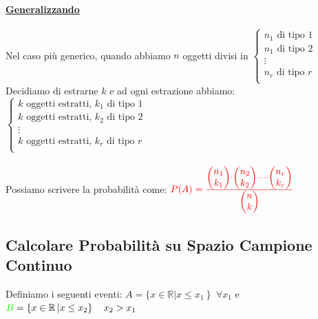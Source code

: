 \documentclass{article}
\begin{document}
\paragraph{\underline{Generalizzando}}
Nel caso più generico, quando abbiamo $n$ oggetti divisi in $\begin{cases}
n_1 \text{ di tipo } 1 \\
n_1 \text{ di tipo } 2 \\
\vdots \\
n_r \text{ di tipo } r \\
\end{cases}$ \\
Decidiamo di estrarne $k$ e ad ogni estrazione abbiamo: $\begin{cases}
k \text{ oggetti estratti, }k_1 \text{ di tipo } 1 \\
k \text{ oggetti estratti, }k_2 \text{ di tipo } 2 \\
\vdots \\
k \text{ oggetti estratti, }k_r \text{ di tipo } r \\
\end{cases}$ \\ \\
Possiamo scrivere la probabilità come: $\color{red} P(A) = \frac{\left(\begin{matrix} n_1 \\ k_1\end{matrix}\right) \cdot \left(\begin{matrix} n_2 \\ k_2\end{matrix}\right) \cdot \dots \cdot \left(\begin{matrix} n_r \\ k_r\end{matrix}\right)} {\left(\begin{matrix} n \\ k\end{matrix}\right)}$

\subsection{Calcolare Probabilità su Spazio Campione Continuo}
Definiamo i seguenti eventi: $A=\{x\in\mathbb{R}\left|x\leq x_1\right\}$ $\forall x_1$ e
${\color{green}B}=\{x\in\mathbb{R}\left|x\leq x_2\right\}\quad x_2>x_1$ \\
\end{document}
